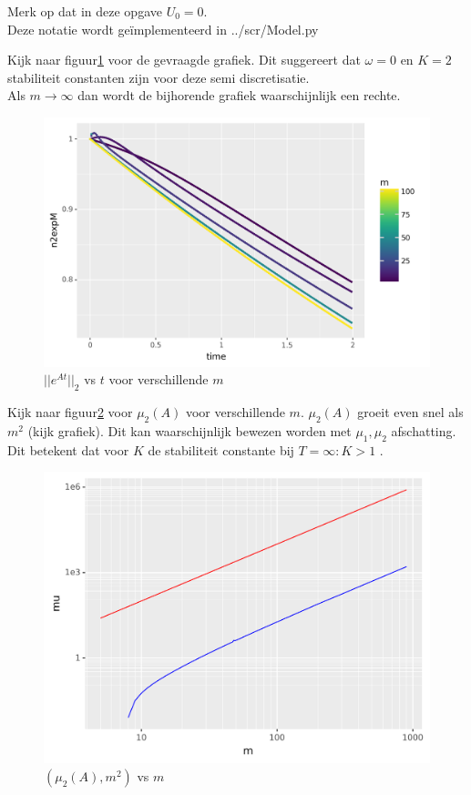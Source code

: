 \documentclass{article}
\begin{document}
Merk op dat in deze opgave $U_{0}=0$.\\
Deze notatie wordt geïmplementeerd in ../scr/Model.py

Kijk naar figuur\ref{fig:mnexp} voor de gevraagde grafiek. Dit suggereert 
dat $\omega = 0$ en $K = 2$ stabiliteit constanten
zijn voor deze semi discretisatie. \\
Als $m \rightarrow \infty$ dan wordt de bijhorende grafiek waarschijnlijk
een rechte.

\begin{figure}
\includegraphics[width=\linewidth]{oefening2.png}
\caption{ $||e^{At}||_{2}$ vs $t$ voor verschillende $m$}\label{fig:mnexp}
\end{figure}

Kijk naar figuur\ref{fig:muA} voor $\mu_{2}(A)$ voor verschillende $m$. 
$\mu_{2}(A)$ groeit even snel als $m^{2}$ (kijk grafiek). Dit kan waarschijnlijk
bewezen worden met $\mu_{1}, \mu_{2}$ afschatting. Dit betekent dat voor  
$K$ de stabiliteit constante bij $T = \infty: K > 1$ .

\begin{figure}
\includegraphics[width=\linewidth]{oefening3.png}
\caption{ $(\mu_{2}(A), m^2)$ vs $m$}\label{fig:muA}
\end{figure}
\end{document}
